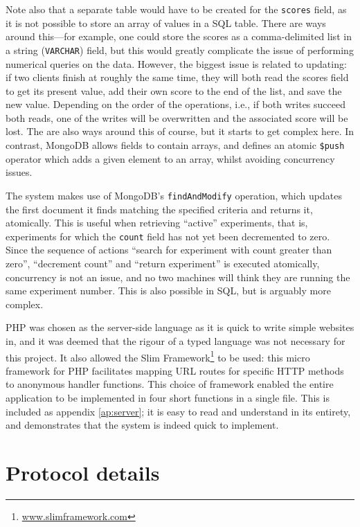 Note also that a separate table would have to be created for the {\tt scores} field, as it is not possible to store an array of values in a SQL table.  There are ways around this---for example, one could store the scores as a comma-delimited list in a string ({\tt VARCHAR}) field, but this would greatly complicate the issue of performing numerical queries on the data.  However, the biggest issue is related to updating: if two clients finish at roughly the same time, they will both read the scores field to get its present value, add their own score to the end of the list, and save the new value.  Depending on the order of the operations, i.e., if both writes succeed both reads, one of the writes will be overwritten and the associated score will be lost.  The are also ways around this of course, but it starts to get complex here.  In contrast, MongoDB allows fields to contain arrays, and defines an atomic {\tt\$push} operator which adds a given element to an array, whilst avoiding concurrency issues.

The system makes use of MongoDB's {\tt findAndModify} operation, which updates the first document it finds matching the specified criteria and returns it, atomically.  This is useful when retrieving ``active'' experiments, that is, experiments for which the {\tt count} field has not yet been decremented to zero.  Since the sequence of actions ``search for experiment with count greater than zero'', ``decrement count'' and ``return experiment'' is executed atomically, concurrency is not an issue, and no two machines will think they are running the same experiment number.  This is also possible in SQL, but is arguably more complex.

PHP was chosen as the server-side language as it is quick to write simple websites in, and it was deemed that the rigour of a typed language was not necessary for this project.  It also allowed the Slim Framework\footnote{\url{www.slimframework.com}} to be used: this micro framework for PHP facilitates mapping URL routes for specific HTTP methods to anonymous handler functions.  This choice of framework enabled the entire application to be implemented in four short functions in a single file.  This is included as appendix \ref{ap:server}; it is easy to read and understand in its entirety, and demonstrates that the system is indeed quick to implement.

\section{Protocol details}


